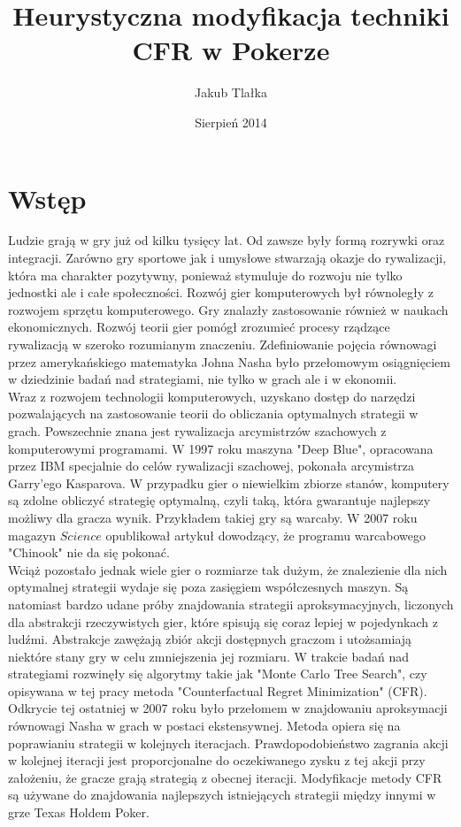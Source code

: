 \documentclass[licencjacka]{pracamgr}
\author{Jakub Tlałka}
\title{Heurystyczna modyfikacja techniki CFR w Pokerze}
\date{Sierpień 2014}
\begin{document}
\maketitle

\begin{abstract}
\end{abstract}

\tableofcontents

\chapter{Wstęp}

\noindent
Ludzie grają w gry już od kilku tysięcy lat. Od zawsze były formą rozrywki oraz integracji.
Zarówno gry sportowe jak i umysłowe stwarzają okazje do rywalizacji, która ma charakter pozytywny, ponieważ
stymuluje do rozwoju nie tylko jednostki ale i całe społeczności. Rozwój gier komputerowych był równoległy
z rozwojem sprzętu komputerowego. Gry znalazły zastosowanie również w naukach
ekonomicznych. Rozwój teorii gier pomógł zrozumieć procesy rządzące rywalizacją w szeroko rozumianym
znaczeniu. Zdefiniowanie pojęcia równowagi przez amerykańskiego matematyka Johna Nasha było przełomowym
osiągnięciem w dziedzinie badań nad strategiami, nie tylko w grach ale i w ekonomii. \\

\noindent
Wraz z rozwojem technologii komputerowych, uzyskano dostęp do narzędzi pozwalających na zastosowanie
teorii do obliczania optymalnych strategii w grach. Powszechnie znana jest rywalizacja
arcymistrzów szachowych z komputerowymi programami. W 1997 roku maszyna "Deep Blue", opracowana przez IBM
specjalnie do celów rywalizacji szachowej, pokonała arcymistrza Garry'ego Kasparova. W przypadku gier
o niewielkim zbiorze stanów, komputery są zdolne obliczyć strategię optymalną, czyli taką, która
gwarantuje najlepszy możliwy dla gracza wynik. Przykładem takiej gry są warcaby. W 2007
roku magazyn $Science$ opublikował artykuł dowodzący, że programu warcabowego "Chinook" nie da się pokonać. \\

\noindent
Wciąż pozostało jednak wiele gier o rozmiarze tak dużym, że znalezienie dla nich optymalnej strategii wydaje
się poza zasięgiem współczesnych maszyn. Są natomiast bardzo udane próby znajdowania strategii aproksymacyjnych,
liczonych dla abstrakcji rzeczywistych gier, które spisują się coraz lepiej w pojedynkach z ludźmi.
Abstrakcje zawężają zbiór akcji dostępnych graczom i utożsamiają niektóre stany gry w celu zmniejszenia jej rozmiaru.
W trakcie badań nad strategiami rozwinęły się algorytmy takie jak "Monte Carlo Tree Search", czy opisywana
w tej pracy metoda "Counterfactual Regret Minimization" (CFR). Odkrycie tej ostatniej w 2007 roku\cite{cfr} było przełomem
w znajdowaniu aproksymacji równowagi Nasha w grach w postaci ekstensywnej. Metoda opiera się na poprawianiu strategii w kolejnych
iteracjach. Prawdopodobieństwo zagrania akcji w kolejnej iteracji jest proporcjonalne do oczekiwanego zysku z tej akcji
przy założeniu, że gracze grają strategią z obecnej iteracji. Modyfikacje metody CFR są używane
do znajdowania najlepszych istniejących strategii między innymi w grze Texas Holdem Poker. \\
\end{document}
